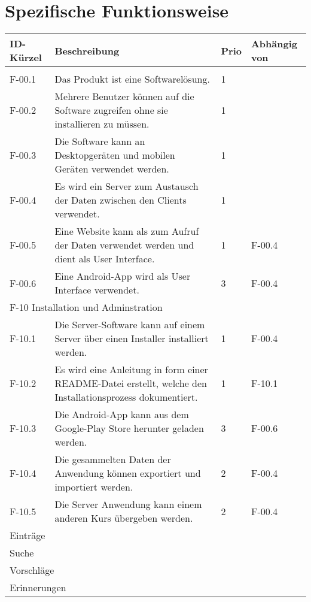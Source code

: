 \section{Spezifische Funktionsweise}
\begin{tabularx}{\textwidth}{|l|X|l|l|}
    \toprule
    \textbf{ID-Kürzel} & \textbf{Beschreibung} & \textbf{Prio} & \textbf{Abhängig von} \\
    \midrule
    \endhead
    \hline
    \caption{Functionen}
    \endfoot
    \multicolumn{4}{|l|}{F-00 Allgemein}\\
    \hline
    F-00.1 & Das Produkt ist eine Softwarelösung. & 1 & \\
    F-00.2 & Mehrere Benutzer können auf die Software zugreifen ohne sie installieren zu müssen. & 1 & \\
    F-00.3 & Die Software kann an Desktopgeräten und mobilen Geräten verwendet werden. & 1 & \\
    F-00.4 & Es wird ein Server zum Austausch der Daten zwischen den Clients verwendet. & 1 & \\
    F-00.5 & Eine Website kann als zum Aufruf der Daten verwendet werden und dient als User Interface. & 1 & F-00.4\\
    F-00.6 & Eine Android-App wird als User Interface verwendet. & 3 & F-00.4\\
    \hline
    \multicolumn{4}{|l|}{F-10 Installation und Adminstration}\\
    \hline
    F-10.1 & Die Server-Software kann auf einem Server über einen Installer installiert werden. & 1 & F-00.4 \\
    F-10.2 & Es wird eine Anleitung in form einer README-Datei erstellt, welche den Installationsprozess dokumentiert. & 1 & F-10.1\\
    F-10.3 & Die Android-App kann aus dem Google-Play Store herunter geladen werden. & 3 & F-00.6\\
    F-10.4 & Die gesammelten Daten der Anwendung können exportiert und importiert werden. & 2 & F-00.4\\
    F-10.5 & Die Server Anwendung kann einem anderen Kurs übergeben werden. & 2 & F-00.4\\
    \hline
    \multicolumn{4}{|l|}{Einträge}\\
    \hline
    \hline
    \multicolumn{4}{|l|}{Suche}\\
    \hline
    \multicolumn{4}{|l|}{Vorschläge}\\
    \hline
    \multicolumn{4}{|l|}{Erinnerungen}\\
    \hline


\end{tabularx}
